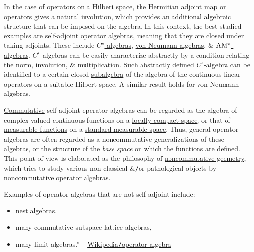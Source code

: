 \documentclass{article}
\begin{document}
In the case of operators on a Hilbert space, the \href{https://en.wikipedia.org/wiki/Hermitian_adjoint}{Hermitian adjoint} map on operators gives a natural \href{https://en.wikipedia.org/wiki/Involution_(mathematics)}{involution}, which provides an additional algebraic structure that can be imposed on the algebra. In this context, the best studied examples are \href{https://en.wikipedia.org/wiki/Self-adjoint}{self-adjoint} operator algebras, meaning that they are closed under taking adjoints. These include \href{https://en.wikipedia.org/wiki/C*-algebra}{$C^\star$ algebras}, \href{https://en.wikipedia.org/wiki/Von_Neumann_algebra}{von Neumann algebras}, \& \href{https://en.wikipedia.org/wiki/AW*-algebra}{$\rm AM^\star$-algebras}. $C^\star$-algebras can be easily characterize abstractly by a condition relating the norm, involution, \& multiplication. Such abstractly defined $C^\star$-algebra can be identified to a certain closed \href{https://en.wikipedia.org/wiki/Subalgebra#Subalgebras_for_algebras_over_a_ring_or_field}{subalgebra} of the algebra of the continuous linear operators on a suitable Hilbert space. A similar result holds for von Neumann algebras.

\href{https://en.wikipedia.org/wiki/Commutative_algebra}{Commutative} self-adjoint operator algebras can be regarded as the algebra of complex-valued continuous functions on a \href{https://en.wikipedia.org/wiki/Locally_compact_space}{locally compact space}, or that of \href{https://en.wikipedia.org/wiki/Measurable_function}{measurable functions} on a \href{https://en.wikipedia.org/wiki/Measurable_space}{standard measurable space}. Thus, general operator algebras are often regarded as a noncommutative generalizations of these algebras, or the structure of the {\it base space} on which the functions are defined. This point of view is elaborated as the philosophy of \href{https://en.wikipedia.org/wiki/Noncommutative_geometry}{noncommutative geometry}, which tries to study various non-classical \&{\tt/}or pathological objects by noncommutative operator algebras.

Examples of operator algebras that are not self-adjoint include:
\begin{itemize}
	\item \href{https://en.wikipedia.org/wiki/Nest_algebra}{nest algebras}.
	\item many commutative subspace lattice algebras,
	\item many limit algebras.'' -- \href{https://en.wikipedia.org/wiki/Operator_algebra}{Wikipedia{\tt/}operator algebra}
\end{itemize}
\end{document}
